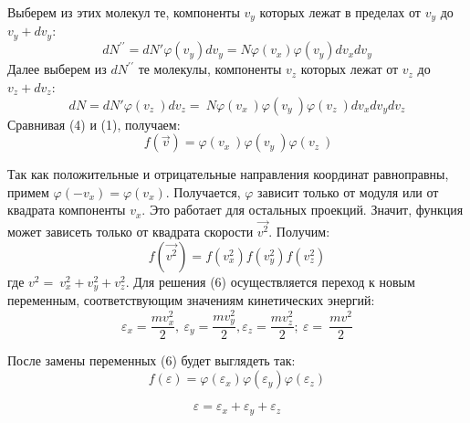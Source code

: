 \documentclass[a4paper,12pt]{article}
\begin{document}
Выберем из этих молекул те, компоненты $v_y$ которых лежат в пределах от $v_y$ до $v_y+dv_y$:
\begin{equation}
dN^{\prime\prime}=dN'\varphi\left(v_y \right)dv_y = N\varphi\left(v_x \right)\varphi\left(v_y \right)dv_xdv_y
\end{equation}
Далее выберем из $dN^{\prime\prime}$ те молекулы, компоненты $v_z$ которых лежат от $v_z$ до $v_z+dv_z$:
\begin{equation}
dN=dN\prime\varphi\left(v_z\ \right)dv_z=\ N\varphi\left(v_x\ \right)\varphi\left(v_y\ \right)\varphi\left(v_z\ \right)dv_xdv_ydv_z
\end{equation}
Сравнивая (4) и (1), получаем:
\begin{equation}
\ f\left(\vec{v}\right)=\varphi\left(v_x\ \right)\varphi\left(v_y\ \right)\varphi\left(v_z\ \right)
\end{equation}

Так как положительные и отрицательные направления координат равноправны, примем $\varphi\left(-v_x \right)= \varphi\left(v_x \right)$. Получается, $\varphi$ зависит только от модуля или от квадрата компоненты $v_x$. Это работает для остальных проекций. Значит, функция может зависеть только от квадрата скорости $\vec{v^2}$. Получим:
\begin{equation}
f\left(\vec{v^2}\right)=f\left(v_x^2\right)f\left(v_y^2\right)f\left(v_z^2\right)
\end{equation}
где $v^2=\ v_x^2+v_y^2+v_z^2$.
Для решения (6) осуществляется переход к новым переменным, соответствующим значениям кинетических энергий:
$$\varepsilon_x=\frac{mv_x^2}{2},\ \varepsilon_y=\frac{mv_y^2}{2}, \varepsilon_z=\frac{mv_z^2}{2};\ \varepsilon=\ \frac{mv^2}{2}$$

После замены переменных (6) будет выглядеть так:
\begin{equation}
f(\varepsilon)=\varphi\left(\varepsilon_x\right)\varphi\left(\varepsilon_y\right)\varphi\left(\varepsilon_z\right)
\end{equation}

\begin{equation}
\varepsilon=\varepsilon_x+\varepsilon_y+\varepsilon_z 
\end{equation}
\end{document}
